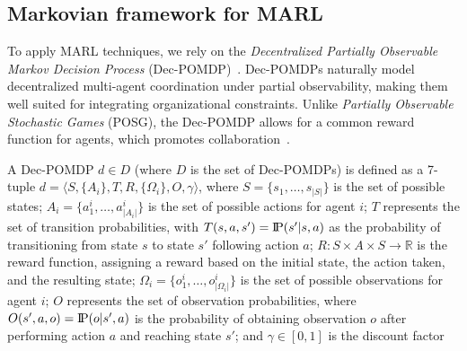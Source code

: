 \documentclass[pdflatex,sn-mathphys-num]{sn-jnl}%
\newcommand{\probP}{\text{I\kern-0.15em P}}
\theoremstyle{thmstyleone}%
\theoremstyle{thmstyletwo}%
\theoremstyle{thmstylethree}%
\begin{document}
\subsection{Markovian framework for MARL}

To apply MARL techniques, we rely on the \textit{Decentralized Partially Observable Markov Decision Process} (Dec-POMDP)~\cite{Oliehoek2016}. Dec-POMDPs naturally model decentralized multi-agent coordination under partial observability, making them well suited for integrating organizational constraints. Unlike \textit{Partially Observable Stochastic Games} (POSG), the Dec-POMDP allows for a common reward function for agents, which promotes collaboration~\cite{Beynier2013}.

A Dec-POMDP $d \in D$ (where $D$ is the set of Dec-POMDPs) is defined as a 7-tuple $d = \langle S, \{A_i\}, T, R, \{\Omega_i\}, O, \gamma \rangle$, where $S = \{s_1,\dots,s_{|S|}\}$ is the set of possible states; $A_{i} = \{a_{1}^{i},\dots,a_{|A_{i}|}^{i}\}$ is the set of possible actions for agent $i$; $T$ represents the set of transition probabilities, with $T(s,a,s') = \probP(s'|s,a)$ as the probability of transitioning from state $s$ to state $s'$ following action $a$; $R: S \times A \times S \rightarrow \mathbb{R}$ is the reward function, assigning a reward based on the initial state, the action taken, and the resulting state; $\Omega_{i} = \{o_{1}^{i},\dots,o_{|\Omega_{i}|}^{i}\}$ is the set of possible observations for agent $i$; $O$ represents the set of observation probabilities, where $O(s',a,o) = \probP(o|s',a)$ is the probability of obtaining observation $o$ after performing action $a$ and reaching state $s'$; and $\gamma \in [0,1]$ is the discount factor
\end{document}
